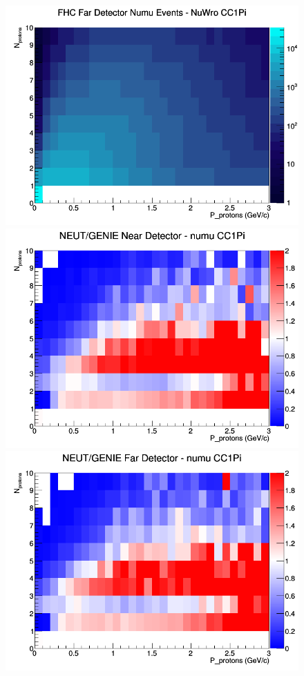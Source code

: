 \documentclass[12pt]{article}
\begin{document}
\begin{figure}[h]
\endminipage
{}
\includegraphics[width=\linewidth]{N_P/nominal/protons/CC1Pi_FHC_FD_numu_N_P_NuWro.png}
\endminipage
\newline
{}
\includegraphics[width=\linewidth]{N_P/nominal/protons/ratios/CC1Pi_NEUT_GENIE_numu_near_N_P.png}
\endminipage
{}
\includegraphics[width=\linewidth]{N_P/nominal/protons/ratios/CC1Pi_NEUT_GENIE_numu_far_N_P.png}

\end{figure}
\end{document}
